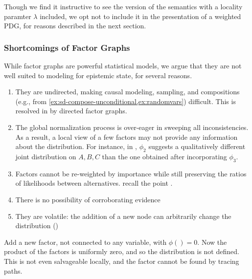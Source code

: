 \documentclass{article}
\numberwithin{equation}{section}
\begin{document}
	Though we find it instructive to see the version of the semantics with a locality paramter $\lambda$ included, we opt not to include it in the presentation of a weighted PDG, for reasons described in the next section.
	

	\subsubsection{Shortcomings of Factor Graphs}

	While factor graphs are powerful statistical models, we argue that they are not well suited to modeling for epistemic state, for several reasons. 

	\begin{enumerate}
		\item They are undirected, making causal modeling, sampling, and compositions (e.g., from \cref{ex:sd-compose-unconditional,ex:randomvars}) difficult. This is resolved in \parencite{frey2012extending} by directed factor graphs. 
		\label{fgproblem:undirected}
		\item The global normalization process is over-eager in sweeping all inconsistencies. As a result, a local view of a few factors may not provide any information about the distribution. For instance, in  , $\phi_2$ suggests a qualitatively different joint distribution on $A,B,C$ than the one obtained after incorporating $\phi_3$. \label{fgproblem:global}
		\item Factors cannot be re-weighted by importance while still preserving the ratios of likelihoods between alternatives. recall the point . \label{fgproblem:reweight}
		\item There is no possibility of corroborating evidence \label{fgproblem:corrob}
		\item They are volatile: the addition of a new node can arbitrarily change the distribution \label{fgproblem:volatile} ()
	\end{enumerate}

	\begin{example}\label{ex:fg-volatile}
		Add a new factor, not connected to any variable, with $\phi() = 0$. Now the product of the factors is uniformly zero, and so the distribution is not defined. This is not even salvageable locally, and the factor cannot be found by tracing paths.  
	\end{example}
\end{document}
